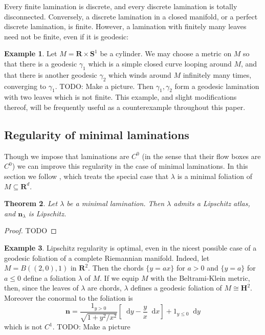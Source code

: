 \documentclass[reqno,10pt]{amsart}
\newcommand{\RR}{\mathbf{R}}
\newcommand{\Hyp}{\mathbf H}
\newcommand{\Sph}{\mathbf S}
\newcommand*\dif{\mathop{}\!\mathrm{d}}
\newcommand{\normal}{\mathbf n}
\newtheorem{theorem}{Theorem}[section]
\theoremstyle{definition}
\newtheorem{example}[theorem]{Example}
\numberwithin{equation}{section}
\begin{document}
Every finite lamination is discrete, and every discrete lamination is totally disconnected.
Conversely, a discrete lamination in a closed manifold, or a perfect discrete lamination, is finite.
However, a lamination with finitely many leaves need not be finite, even if it is geodesic:

\begin{example}\label{two geodesics}
Let $M = \RR \times \Sph^1$ be a cylinder.
We may choose a metric on $M$ so that there is a geodesic $\gamma_1$ which is a simple closed curve looping around $M$, and that there is another geodesic $\gamma_2$ which winds around $M$ infinitely many times, converging to $\gamma_1$.
TODO: Make a picture.
Then $\gamma_1, \gamma_2$ form a geodesic lamination with two leaves which is not finite.
This example, and slight modifications thereof, will be frequently useful as a counterexample throughout this paper.
\end{example}




\subsection{Regularity of minimal laminations}\label{RegularitySec}
Though we impose that laminations are $C^0$ (in the sense that their flow boxes are $C^0$) we can improve this regularity in the case of minimal laminations.
In this section we follow \cite{Solomon86}, which treats the special case that $\lambda$ is a minimal foliation of $M \subseteq \RR^d$.

\begin{theorem}\label{regularity theorem}
Let $\lambda$ be a minimal lamination. Then $\lambda$ admits a Lipschitz atlas, and $\normal_\lambda$ is Lipschitz.
\end{theorem}
\begin{proof}
TODO
\end{proof}

\begin{example}
Lipschitz regularity is optimal, even in the nicest possible case of a geodesic foliation of a complete Riemannian manifold.
Indeed, let $M = B((2, 0), 1)$ in $\RR^2$. Then the chords $\{y = ax\}$ for $a > 0$ and $\{y = a\}$ for $a \leq 0$ define a foliation $\lambda$ of $M$.
If we equip $M$ with the Beltrami-Klein metric, then, since the leaves of $\lambda$ are chords, $\lambda$ defines a geodesic foliation of $M \cong \Hyp^2$.
Moreover the conormal to the foliation is
$$\normal = \frac{1_{y > 0}}{\sqrt{1 + y^2/x^2}} \left[\dif y - \frac{y}{x} \dif x\right] + 1_{y \leq 0} \dif y$$
which is not $C^1$.
TODO: Make a picture
\end{example}
\end{document}
